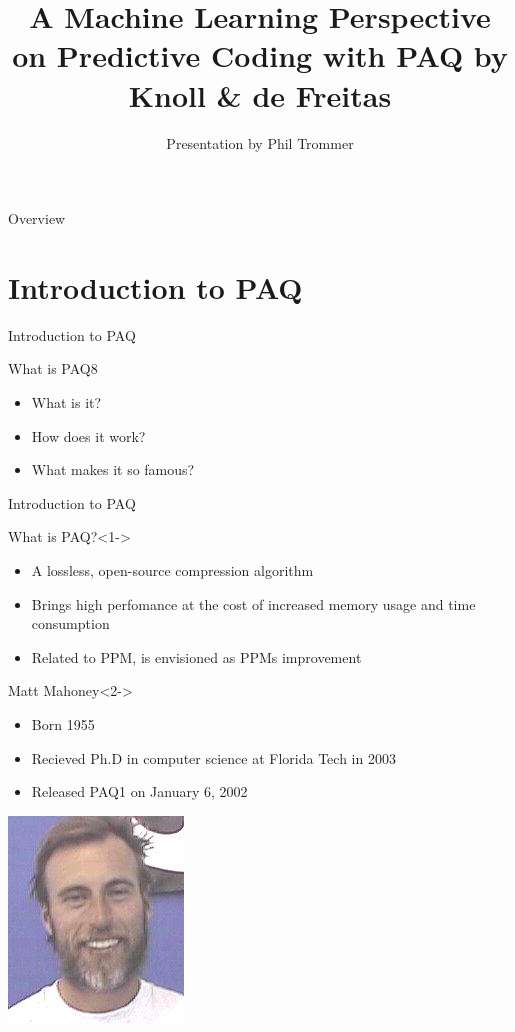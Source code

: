 \documentclass[11pt,usenames,dvipsnames]{beamer}
\author{Presentation by Phil Trommer}
\title{A Machine Learning Perspective on Predictive Coding with PAQ by Knoll \& de Freitas}
\begin{document}
\begin{frame}
\titlepage
\end{frame}


\begin{frame}{Overview}
\tableofcontents
\end{frame}


\section{Introduction to PAQ}


\begin{frame}{Introduction to PAQ}
	\begin{block}{What is PAQ8}
			\begin{itemize}
				\item What is it?
				\item How does it work?
				\item What makes it so famous?
			\end{itemize}
	\end{block}
\end{frame}

\begin{frame}{Introduction to PAQ}

	
	\begin{alertblock}{What is PAQ?}<1->
		\begin{itemize}
			\item A lossless, open-source compression algorithm
			\item Brings high perfomance at the cost of increased memory usage and time consumption
			\item Related to PPM, is envisioned as PPMs improvement
		\end{itemize}
	\end{alertblock}
\end{frame}

	\begin{exampleblock}{Matt Mahoney}<2->
	\begin{minipage}[b]{0.70\linewidth}
		\begin{itemize}
			\item Born 1955
			\item Recieved Ph.D in computer science at Florida Tech in 2003
			\item Released PAQ1 on January 6, 2002
		\end{itemize}
	\hfill
	\end{minipage}
	\begin{minipage}[b]{0.28\linewidth}
		\includegraphics[scale=1.5]{files/matt.jpg}
	\end{minipage}
	\end{exampleblock}
\end{document}

